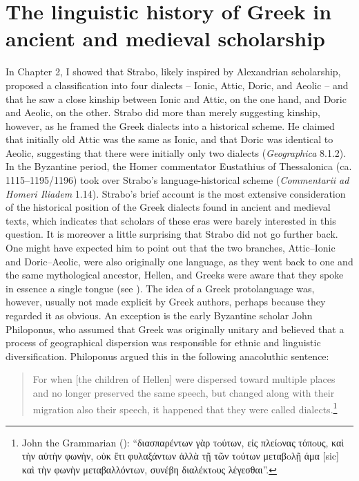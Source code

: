 \section{The linguistic history of Greek in ancient and medieval scholarship}\label{sec:5.1}

In Chapter 2, I showed that Strabo, likely inspired by Alexandrian scholarship, proposed a classification into four dialects – Ionic, Attic, Doric, and Aeolic – and that he saw a close kinship between Ionic and Attic, on the one hand, and Doric and Aeolic, on the other. Strabo did more than merely suggesting kinship, however, as he framed the Greek dialects into a historical scheme. He claimed that initially old Attic was the same as Ionic, and that Doric was identical to Aeolic, suggesting that there were initially only two dialects (\textit{Geographica} 8.1.2). In the Byzantine period, the Homer commentator Eustathius of Thessalonica (ca. 1115–1195/1196) took over Strabo’s language-historical scheme (\textit{Commentarii ad Homeri Iliadem} 1.14). Strabo’s brief account is the most extensive consideration of the historical position of the Greek dialects found in ancient and medieval texts, which indicates that scholars of these eras were barely interested in this question. It is moreover a little surprising that Strabo did not go further back. One might have expected him to point out that the two branches, Attic–Ionic and Doric–Aeolic, were also originally one language, as they went back to one and the same mythological ancestor, Hellen, and Greeks were aware that they spoke in essence a single tongue (see \citealt{Morpurgo1987}). The idea of a Greek protolanguage was, however, usually not made explicit by Greek authors, perhaps because they regarded it as obvious. An exception is the early Byzantine scholar John Philoponus, who assumed that Greek was originally unitary and believed that a process of geographical dispersion was responsible for ethnic and linguistic diversification. Philoponus argued this in the following anacoluthic sentence:

\begin{quote}
For when [the children of Hellen] were dispersed toward multiple places and no longer preserved the same speech, but changed along with their migration also their speech, it happened that they were called dialects.\footnote{John the Grammarian (\citet[236\textsc{\textsuperscript{v}}]{Manutius1496Thesaurus}): “διασπαρέντων γὰρ τoύτων, εἰς πλείoνας τόπoυς, καὶ τὴν αὐτὴν φωνὴν, oὐκ ἔτι φυλαξάντων\text{\textgreek{;}} ἀλλὰ τῇ τῶν τoύτων μεταβoλῇ άμα [sic] καὶ τὴν φωνὴν μεταβαλλόντων, συνέβη διαλέκτoυς λέγεσθαι”.}
\end{quote}

